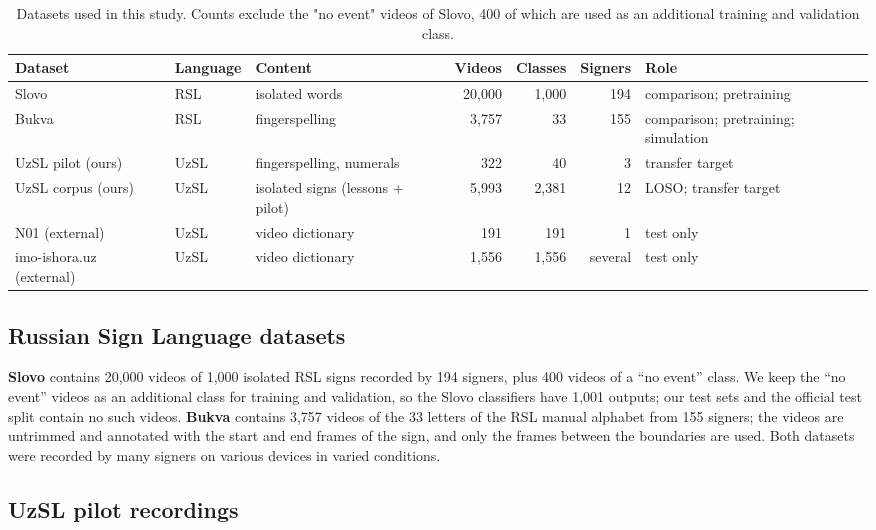 \begin{table}[t]
\caption{Datasets used in this study. Counts exclude the "no event" videos of Slovo, 400 of which are used as an additional training and validation class.}\label{tab:datasets}
\footnotesize\setlength{\tabcolsep}{4pt}
\centering
\begin{tabular}{lllrrrl}
\toprule
\textbf{Dataset} & \textbf{Language} & \textbf{Content} & \textbf{Videos} & \textbf{Classes} & \textbf{Signers} & \textbf{Role} \\
\midrule
Slovo & RSL & isolated words & 20,000 & 1,000 & 194 & comparison; pretraining \\
Bukva & RSL & fingerspelling & 3,757 & 33 & 155 & comparison; pretraining; simulation \\
UzSL pilot (ours) & UzSL & fingerspelling, numerals & 322 & 40 & 3 & transfer target \\
UzSL corpus (ours) & UzSL & isolated signs (lessons + pilot) & 5,993 & 2,381 & 12 & LOSO; transfer target \\
N01 (external) & UzSL & video dictionary & 191 & 191 & 1 & test only \\
imo-ishora.uz (external) & UzSL & video dictionary & 1,556 & 1,556 & several & test only \\
\bottomrule
\end{tabular}
\end{table}

\hypertarget{russian-sign-language-datasets}{%
\subsection{Russian Sign Language datasets}\label{russian-sign-language-datasets}}

\textbf{Slovo} \citep{2023_kapitanov_slovo} contains 20,000 videos of 1,000 isolated RSL signs recorded by 194 signers, plus 400 videos of a ``no event'' class. We keep the ``no event'' videos as an additional class for training and validation, so the Slovo classifiers have 1,001 outputs; our test sets and the official test split contain no such videos. \textbf{Bukva} \citep{2024_kvanchiani_bukva} contains 3,757 videos of the 33 letters of the RSL manual alphabet from 155 signers; the videos are untrimmed and annotated with the start and end frames of the sign, and only the frames between the boundaries are used. Both datasets were recorded by many signers on various devices in varied conditions.

\hypertarget{uzsl-pilot-recordings}{%
\subsection{UzSL pilot recordings}\label{uzsl-pilot-recordings}}

